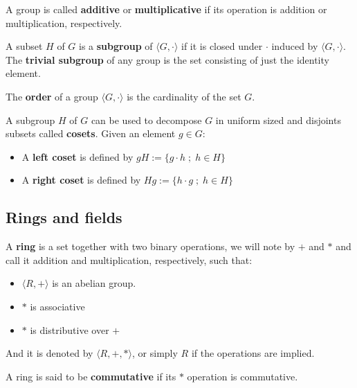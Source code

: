 \documentclass[a4paper,12pt]{article}
\begin{document}
\noindent
A group is called \textbf{additive} or \textbf{multiplicative} if its
operation is addition or multiplication, respectively.

\begin{definition}
  A subset $H$ of $G$ is a \textbf{subgroup} of $\langle G,\cdot \rangle$ if it is
  closed under $\cdot$ induced by $\langle G,\cdot \rangle$. The \textbf{trivial subgroup} of any
  group is the set consisting of just the identity element.
\end{definition}

\begin{definition}
  The \textbf{order} of a group $\langle G,\cdot\rangle$ is the cardinality of the set $G$.
\end{definition}

\begin{definition}
  A subgroup $H$ of $G$ can be used to decompose $G$ in uniform sized and
  disjoints subsets called \textbf{cosets}. Given an element $g \in G$:
  \begin{itemize}
  \item A \textbf{left coset} is defined by $gH := \{g\cdot h \; ; \; h \in H\}$
  \item A \textbf{right coset} is defined by $Hg := \{h\cdot g \; ; \; h \in H\}$
  \end{itemize}
\end{definition}

\subsection{Rings and fields}
\label{sec:org29f3b38}

   \begin{definition}
  A \textbf{ring} is a set together with two binary operations, we will note by
  $+$ and $*$ and call it addition and multiplication, respectively, such that:
  \begin{itemize}
  \item $\langle R,+\rangle$ is an abelian group.
  \item $*$ is associative
  \item $*$ is distributive over $+$
  \end{itemize}

  And it is denoted by $\langle R,+,*\rangle$, or simply $R$ if the operations are implied.
\end{definition}

\begin{definition}
  A ring is said to be \textbf{commutative} if its $*$ operation is commutative.
\end{definition}
\end{document}
